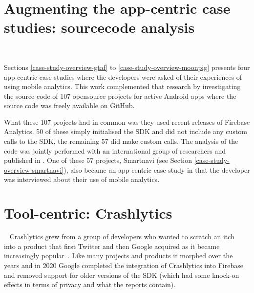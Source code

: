 \section{Augmenting the app-centric case studies: sourcecode analysis}~\label{section-sourcecode-analysis-to-augment-app-centric-case-studies}

Sections \ref{case-study-overview-gtaf} to \ref{case-study-overview-moonpig} presents four app-centric case studies where the developers were asked of their experiences of using mobile analytics. This work complemented that research by investigating the source code of 107 opensource projects for active Android apps where the source code was freely available on GitHub. 

What these 107 projects had in common was they used recent releases of Firebase Analytics. 50 of these simply initialised the SDK and did not include any custom calls to the SDK, the remaining 57 did make custom calls. The analysis of the code was jointly performed with an international group of researchers and published in . One of these 57 projects, Smartnavi (see Section \ref{case-study-overview-smartnavi}), also became an app-centric case study in that the developer was interviewed about their use of mobile analytics. 



\section{Tool-centric: Crashlytics}~\label{case-study-overview-crashlytics}
Crashlytics grew from a group of developers who wanted to scratch an itch~ into a product that first Twitter and then Google acquired as it became increasingly popular~. 
Like many projects and products it morphed over the years and in 2020 Google completed the integration of Crashlytics into Firebase and removed support for older versions of the SDK (which had some knock-on effects in terms of privacy and what the reports contain).

